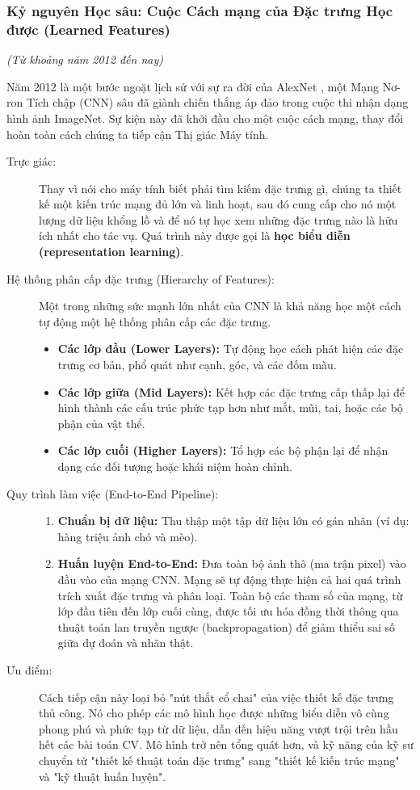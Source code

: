 \subsubsection{Kỷ nguyên Học sâu: Cuộc Cách mạng của Đặc trưng Học được (Learned Features)}
\textit{(Từ khoảng năm 2012 đến nay)}

Năm 2012 là một bước ngoặt lịch sử với sự ra đời của AlexNet \cite{Krizhevsky2012}, một Mạng Nơ-ron Tích chập (CNN) sâu đã giành chiến thắng áp đảo trong cuộc thi nhận dạng hình ảnh ImageNet. Sự kiện này đã khởi đầu cho một cuộc cách mạng, thay đổi hoàn toàn cách chúng ta tiếp cận Thị giác Máy tính.

\begin{description}
    \item[Trực giác:] Thay vì nói cho máy tính biết phải tìm kiếm đặc trưng gì, chúng ta thiết kế một kiến trúc mạng đủ lớn và linh hoạt, sau đó cung cấp cho nó một lượng dữ liệu khổng lồ và để nó tự học xem những đặc trưng nào là hữu ích nhất cho tác vụ. Quá trình này được gọi là \textbf{học biểu diễn (representation learning)}.
    \item[Hệ thống phân cấp đặc trưng (Hierarchy of Features):] Một trong những sức mạnh lớn nhất của CNN là khả năng học một cách tự động một hệ thống phân cấp các đặc trưng.
    \begin{itemize}
        \item \textbf{Các lớp đầu (Lower Layers):} Tự động học cách phát hiện các đặc trưng cơ bản, phổ quát như cạnh, góc, và các đốm màu.
        \item \textbf{Các lớp giữa (Mid Layers):} Kết hợp các đặc trưng cấp thấp lại để hình thành các cấu trúc phức tạp hơn như mắt, mũi, tai, hoặc các bộ phận của vật thể.
        \item \textbf{Các lớp cuối (Higher Layers):} Tổ hợp các bộ phận lại để nhận dạng các đối tượng hoặc khái niệm hoàn chỉnh.
    \end{itemize}
    \item[Quy trình làm việc (End-to-End Pipeline):]
    \begin{enumerate}
        \item \textbf{Chuẩn bị dữ liệu:} Thu thập một tập dữ liệu lớn có gán nhãn (ví dụ: hàng triệu ảnh chó và mèo).
        \item \textbf{Huấn luyện End-to-End:} Đưa toàn bộ ảnh thô (ma trận pixel) vào đầu vào của mạng CNN. Mạng sẽ tự động thực hiện cả hai quá trình trích xuất đặc trưng và phân loại. Toàn bộ các tham số của mạng, từ lớp đầu tiên đến lớp cuối cùng, được tối ưu hóa đồng thời thông qua thuật toán lan truyền ngược (backpropagation) để giảm thiểu sai số giữa dự đoán và nhãn thật.
    \end{enumerate}
    \item[Ưu điểm:] Cách tiếp cận này loại bỏ "nút thắt cổ chai" của việc thiết kế đặc trưng thủ công. Nó cho phép các mô hình học được những biểu diễn vô cùng phong phú và phức tạp từ dữ liệu, dẫn đến hiệu năng vượt trội trên hầu hết các bài toán CV. Mô hình trở nên tổng quát hơn, và kỹ năng của kỹ sư chuyển từ "thiết kế thuật toán đặc trưng" sang "thiết kế kiến trúc mạng" và "kỹ thuật huấn luyện".
\end{description}

